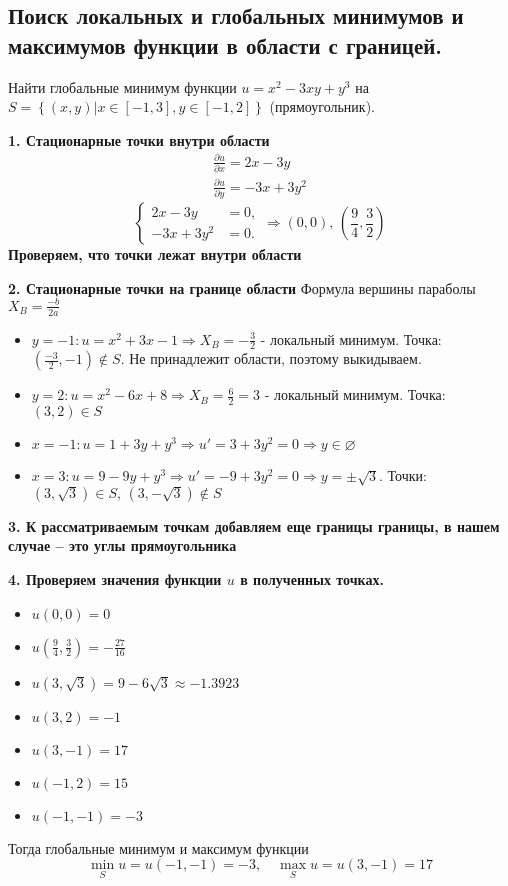 \subsection{Поиск локальных и глобальных минимумов и максимумов функции в
области с границей.}
\begin{example}
  Найти глобальные минимум функции $u=x^2-3xy+y^3$ на $S=\left\{(x,y)|x\in[-1,3], y\in[-1,2]\right\}$ (прямоугольник).
  \begin{solution}
  	\textbf{1. Стационарные точки внутри области}
  	\begin{align*}
  		\frac{\partial u }{\partial x} = 2x-3y\\
  		\frac{\partial u }{\partial y} = -3x+3y^2
  	\end{align*}
  	\begin{equation*}
  		\begin{cases}
  			2x-3y &= 0,\\
  			-3x+3y^2 &= 0.
  		\end{cases}
  		\Rightarrow (0,0),\,\left(\frac{9}{4},\frac{3}{2}\right)
  	\end{equation*}
  	\textbf{Проверяем, что точки лежат внутри области}
  	
  	\textbf{2. Стационарные точки на границе области}
  	Формула вершины параболы $X_{B} = \frac{-b}{2a}$
  	\begin{itemize}
  		\item $y=-1: u=x^2+3x-1\Rightarrow X_{B} = -\frac{3}{2}$ - локальный минимум. 
  		Точка: $\left(\frac{-3}{2}, -1\right) \notin S$. Не принадлежит области, поэтому выкидываем.
  		\item $y=2: u=x^2-6x+8\Rightarrow X_B = \frac{6}{2}=3$ - локальный минимум.
  		Точка: $(3,2)\in S$
  		\item $x=-1: u=1+3y+y^3\Rightarrow u'=3+3y^2=0 \Rightarrow y\in \varnothing$
  		\item $x=3: u=9-9y+y^3\Rightarrow u'=-9+3y^2=0 \Rightarrow y=\pm\sqrt{3}$. Точки: $(3,\sqrt{3})\in S,\,(3,-\sqrt{3})\notin S$
  	\end{itemize}
  	
  	\textbf{3. К рассматриваемым точкам добавляем еще границы границы, в нашем случае -- это углы прямоугольника}
  	
  	\textbf{4. Проверяем значения функции $u$ в полученных точках.}
  	\begin{itemize}
  		\item $u(0,0)=0$
  		\item $u(\frac{9}{4},\frac{3}{2})=-\frac{27}{16}$
  		\item $u(3,\sqrt{3})=9-6\sqrt{3}\approx-1.3923$
  		\item $u(3,2)=-1$
  		\item $u(3,-1)=17$
  		\item $u(-1,2)=15$
  		\item $u(-1,-1)=-3$
  	\end{itemize}
  	
  	Тогда глобальные минимум и максимум функции
  	\begin{equation*}
  		\boxed{\min_{S} u = u(-1,-1)=-3,\quad \max_{S} u = u(3,-1)=17}
  	\end{equation*}
  \end{solution}
\end{example}


